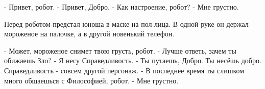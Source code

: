 - Привет, робот.
- Привет, Добро.
- Как настроение, робот?
- Мне грустно.

Перед роботом предстал юноша в маске на пол-лица. В одной руке он держал мороженое на палочке, а в другой новенький телефон.

- Может, мороженое снимет твою грусть, робот.
- Лучше ответь, зачем ты обижаешь Зло?
- Я несу Справедливость.
- Ты путаешь, Добро. Ты несёшь добро. Справедливость - совсем другой персонаж.
- В последнее время ты слишком много общаешься с Философией, робот. 
- Мне грустно.